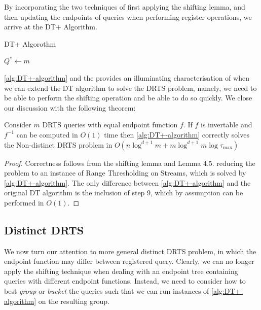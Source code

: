By incorporating the two techniques of first applying the shifting lemma, and then updating the endpoints of queries when performing register operations, we arrive at the DT+ Algorithm. 

\begin{algorithm}
\caption{DT+ Algorothm}\label{alg:DT+-algorithm}
\begin{algorithmic}[1]
\Require $Q^* \gets m$ 
\State {}
    \State {}
    \State {}
\EndFor
\State {} 
    \State {}
    \State {}
    \State {}
    \State {}
    \EndFor
\EndFor
\end{algorithmic}
\end{algorithm}

\cref{alg:DT+-algorithm} and the provides an illuminating characterisation of when we can extend the DT algorithm to solve the DRTS problem, namely, we need to be able to perform the shifting operation and be able to do so quickly. We close our discussion with the following theorem:

\begin{theorem}
    Consider $m$ DRTS queries with equal endpoint function $f$. If $f$ is invertable and $f^{-1}$ can be computed in $O(1)$ time then \cref{alg:DT+-algorithm} correctly solves the Non-distinct DRTS problem in $O(n\log^{d+1}m + m\log^{d+1}m\log\tau_{\max})$
\end{theorem}
\begin{proof}
    Correctness follows from the shifting lemma and Lemma 4.5. reducing the problem to an instance of Range Thresholding on Streams, which is solved by \cref{alg:DT+-algorithm}. The only difference between \cref{alg:DT+-algorithm} and the original DT algorithm is the inclusion of step 9, which by assumption can be performed in $O(1)$. 
\end{proof}

\newpage
\subsection{Distinct DRTS}
\label{ssec:distinc-DRTS}
We now turn our attention to more general distinct DRTS problem, in which the endpoint function may differ between registered query. Clearly, we can no longer apply the shifting technique when dealing with an endpoint tree containing queries with different endpoint functions. Instead, we need to consider how to best \textit{group} or \textit{bucket} the queries such that we can run instances of \cref{alg:DT+-algorithm} on the resulting group.

